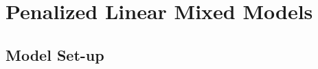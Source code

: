 \documentclass[12pt,letter]{article}\usepackage[]{graphicx}\usepackage[]{color}
\begin{document}
\FloatBarrier






\section{Penalized Linear Mixed Models}



\subsection{Model Set-up}
\end{document}
